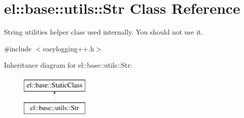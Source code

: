 \hypertarget{classel_1_1base_1_1utils_1_1Str}{\section{el\-:\-:base\-:\-:utils\-:\-:Str Class Reference}
\label{classel_1_1base_1_1utils_1_1Str}
}


String utilities helper class used internally. You should not use it.  




{\ttfamily \#include $<$easylogging++.\-h$>$}

Inheritance diagram for el\-:\-:base\-:\-:utils\-:\-:Str\-:\begin{figure}[H]
\begin{center}
\leavevmode
\includegraphics[height=2.000000cm]{classel_1_1base_1_1utils_1_1Str}
\end{center}
\end{figure}
